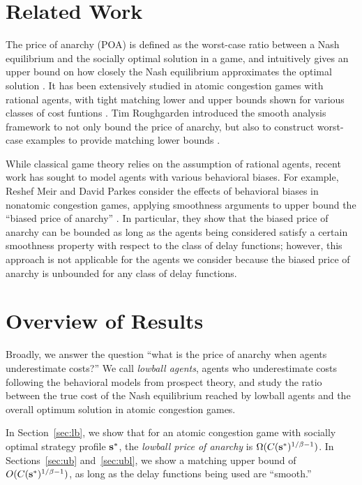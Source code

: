 \documentclass[twoside]{article}
\begin{document}
\begin{multicols}{2}
\section{Related Work}
The price of anarchy (POA) is defined as the worst-case ratio between a Nash
equilibrium and the socially optimal solution in a game, and intuitively gives
an upper bound on how closely the Nash equilibrium approximates the optimal
solution \cite{Koutsoupias2009}. It has been extensively studied in atomic
congestion games with rational agents, with tight matching lower and upper
bounds shown for various classes of cost funtions
\cite{Aland2011,Roughgarden2012}. Tim Roughgarden introduced the smooth analysis
framework to not only bound the price of anarchy, but also to construct
worst-case examples to provide matching lower bounds \cite{Roughgarden2012}.

While classical game theory relies on the assumption of rational agents, recent
work has sought to model agents with various behavioral biases. For example,
Reshef Meir and David Parkes consider the effects of behavioral biases in
nonatomic congestion games, applying smoothness arguments to upper bound the
``biased price of anarchy'' \cite{Meir2014}. In particular, they show that the
biased price of anarchy can be bounded as long as the agents being considered
satisfy a certain smoothness property with respect to the class of delay
functions; however, this approach is not applicable for the agents we consider
because the biased price of anarchy is unbounded for any class of delay
functions.

\section{Overview of Results}
Broadly, we answer the question ``what is the price of anarchy when agents
underestimate costs?'' We call \textit{lowball agents}, agents who underestimate
costs following the behavioral models from prospect theory, and study the ratio between the true cost of the Nash equilibrium reached by lowball agents and the overall optimum solution in atomic congestion games.

In Section~\ref{sec:lb}, we show that for an atomic congestion game with
socially optimal strategy profile $\mathbf{s}^*$, the \textit{lowball price of anarchy} is
$\Omega(C(\mathbf{s}^*)^{1/\beta-1})$. In Sections~\ref{sec:ub} and~\ref{sec:ubl}, we
show a matching upper bound of $O(C(\mathbf{s}^*)^{1/\beta - 1})$, as long as the delay
functions being used are ``smooth.''


\end{multicols}
\end{document}
